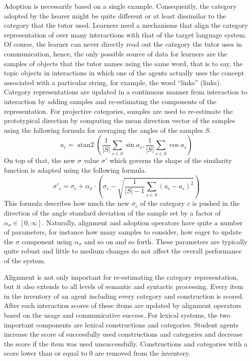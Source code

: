 Adoption is necessarily based on a single example. Consequently, the category
adopted by the hearer might be quite different or at least dissimilar to the category
that the tutor used. Learners need a mechanisms that align the category 
representation of over many interactions with that of the target language system. 
Of course, the learner can never directly read out 
the category the tutor uses in communication, hence, the only possible source of 
data for learners are the samples of objects that the tutor names using the same word, 
that is to say, the topic objects in interactions in which one of the agents actually uses 
the concept associated with a particular string, for example, the word ``links'' (links). Category representations are updated in a continuous manner 
from interaction to interaction by adding samples and re-estimating the components of 
the representation. For projective categories, samples are used to 
re-estimate the prototypical direction by computing the mean direction vector of 
the samples using the following formula for averaging the angles of the samples $S$.
\begin{equation}
a_c = \operatorname{atan2}\left(\frac{1}{|S|}\sum_{s\in S}\sin a_s,\frac{1}{|S|}\sum_{s\in S}\cos a_s\right)
\label{e:update-a}
\end{equation} 
On top of that, the new $\sigma$ value $\sigma'$ 
which governs the shape of the similarity function is adapted using the following formula.
\begin{equation}
\sigma'_c = \sigma_c + \alpha_\sigma \cdot \left(\sigma_c - \sqrt{\frac{1}{|S|-1}\sum_{s\in S}(a_c - a_s)^2}\right)
\label{e:update-sigma-a}
\end{equation} 
This formula describes how much the new $\sigma_c$ of the category $c$ 
is pushed in the direction of the angle standard deviation of the sample set 
by a factor of $\alpha_\sigma \in [0,\infty]$. Naturally, alignment and
adoption operators have quite a number of parameters, for instance
how many samples to consider, how eager to update the $\sigma$ component using
$\alpha_\sigma$ and so on and so forth. These parameters are typically quite robust and little to
medium changes do not affect the overall performance of the system.

Alignment is not only important for re-estimating the category representation,
but it also extends to all levels of semantic and syntactic processing. Every item 
in the inventory of an agent including every category and construction is scored. 
After each interaction scores of these items are updated by alignment operators 
based on the usage and communicative success. 
For lexical systems, the two important components are
lexical constructions and categories. Student agents increase the score of successfully
used constructions and categories and decrease the score 
if the item was used unsuccessfully. Constructions and categories with 
a score lower than or equal to $0$ are removed from the inventory. 


